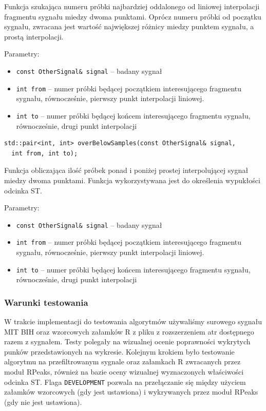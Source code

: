 \documentclass[a4paper, 11pt]{article}
\begin{document}
Funkcja szukająca numeru próbki najbardziej oddalonego od liniowej interpolacji
fragmentu sygnału miedzy dwoma punktami. Oprócz numeru próbki od początku
sygnału, zwracana jest wartość największej różnicy miedzy punktem sygnału, a
prostą interpolacji.

Parametry:
\begin{itemize}
  \item \verb|const OtherSignal& signal|  -- badany sygnał
  \item \verb|int from|  -- numer próbki będącej początkiem interesującego
    fragmentu sygnału, równocześnie, pierwszy punkt interpolacji liniowej.
  \item \verb|int to|  -- numer próbki będącej końcem interesującego fragmentu
    sygnału, równocześnie, drugi punkt interpolacji
\end{itemize}

\begin{lstlisting}
std::pair<int, int> overBelowSamples(const OtherSignal& signal,
  int from, int to);
\end{lstlisting}

Funkcja obliczająca ilość próbek ponad i poniżej prostej interpolującej sygnał
miedzy dwoma punktami. Funkcja wykorzystywana jest do określenia wypukłości
odcinka ST.

Parametry:
\begin{itemize}
  \item \verb|const OtherSignal& signal|  -- badany sygnał
  \item \verb|int from|  -- numer próbki będącej początkiem interesującego
    fragmentu sygnału, równocześnie, pierwszy punkt interpolacji liniowej.
  \item \verb|int to|  -- numer próbki będącej końcem interesującego fragmentu
    sygnału, równocześnie, drugi punkt interpolacji
\end{itemize}

\subsubsection{Warunki testowania}
\label{sec:st_interval:tests}
W trakcie implementacji do testowania algorytmów używaliśmy surowego sygnału MIT BIH oraz wzorcowych załamków R z pliku z rozszerzeniem atr dostępnego razem z sygnałem. Testy polegały na wizualnej ocenie poprawności wykrytych punków przedstawionych na wykresie. Kolejnym krokiem było testowanie algorytmu na przefiltrowanym sygnale oraz załamkach R zwracanych przez moduł RPeaks, również na bazie oceny wizualnej wyznaczonych właściwości odcinka ST. Flaga \verb|DEVELOPMENT| pozwala na przełączanie się między użyciem załamków wzorcowych (gdy jest ustawiona) i wykrywanych przez moduł RPeaks (gdy nie jest ustawiona).
\end{document}
